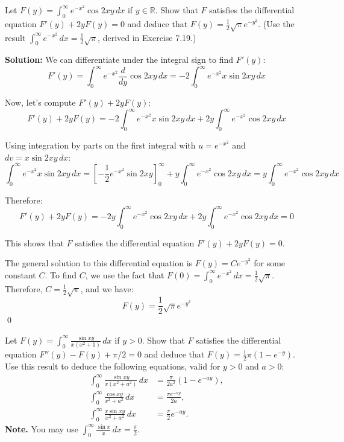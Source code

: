 \begin{problembox}
Let $F(y) = \int_{0}^{\infty} e^{-x^2} \cos 2xy \, dx$ if $y \in \mathbb{R}$. Show that $F$ satisfies the differential equation $F'(y) + 2y F(y) = 0$ and deduce that $F(y) = \frac{1}{2} \sqrt{\pi} e^{-y^2}$. (Use the result $\int_{0}^{\infty} e^{-x^2} \, dx = \frac{1}{2} \sqrt{\pi}$, derived in Exercise 7.19.)
\end{problembox}

\noindent\textbf{Solution:}
We can differentiate under the integral sign to find $F'(y)$:
\[F'(y) = \int_{0}^{\infty} e^{-x^2} \frac{d}{dy} \cos 2xy \, dx = -2 \int_{0}^{\infty} e^{-x^2} x \sin 2xy \, dx\]

Now, let's compute $F'(y) + 2y F(y)$:
\[F'(y) + 2y F(y) = -2 \int_{0}^{\infty} e^{-x^2} x \sin 2xy \, dx + 2y \int_{0}^{\infty} e^{-x^2} \cos 2xy \, dx\]

Using integration by parts on the first integral with $u = e^{-x^2}$ and $dv = x \sin 2xy \, dx$:
\[\int_{0}^{\infty} e^{-x^2} x \sin 2xy \, dx = \left[-\frac{1}{2} e^{-x^2} \sin 2xy\right]_{0}^{\infty} + y \int_{0}^{\infty} e^{-x^2} \cos 2xy \, dx = y \int_{0}^{\infty} e^{-x^2} \cos 2xy \, dx\]

Therefore:
\[F'(y) + 2y F(y) = -2y \int_{0}^{\infty} e^{-x^2} \cos 2xy \, dx + 2y \int_{0}^{\infty} e^{-x^2} \cos 2xy \, dx = 0\]

This shows that $F$ satisfies the differential equation $F'(y) + 2y F(y) = 0$.

The general solution to this differential equation is $F(y) = C e^{-y^2}$ for some constant $C$. To find $C$, we use the fact that $F(0) = \int_{0}^{\infty} e^{-x^2} \, dx = \frac{1}{2} \sqrt{\pi}$. Therefore, $C = \frac{1}{2} \sqrt{\pi}$, and we have:
\[F(y) = \frac{1}{2} \sqrt{\pi} e^{-y^2}\]\qed


\begin{problembox}
Let $F(y) = \int_{0}^{\infty} \frac{\sin xy}{x(x^2 + 1)} \, dx$ if $y > 0$. Show that $F$ satisfies the differential equation $F''(y) - F(y) + \pi / 2 = 0$ and deduce that $F(y) = \frac{1}{2} \pi (1 - e^{-y})$. Use this result to deduce the following equations, valid for $y > 0$ and $a > 0$:
\begin{align*}
\int_{0}^{\infty} \frac{\sin xy}{x(x^2 + a^2)} \, dx &= \frac{\pi}{2a^2} (1 - e^{-ay}), \\
\int_{0}^{\infty} \frac{\cos xy}{x^2 + a^2} \, dx &= \frac{\pi e^{-ay}}{2a}, \\
\int_{0}^{\infty} \frac{x \sin xy}{x^2 + a^2} \, dx &= \frac{\pi}{2} e^{-ay}.
\end{align*}
\textbf{Note.} You may use $\int_{0}^{\infty} \frac{\sin x}{x} \, dx = \frac{\pi}{2}.$
\end{problembox}

